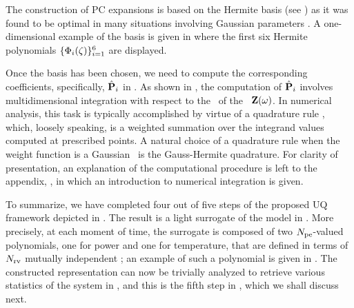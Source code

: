 The construction of PC expansions is based on the Hermite basis (see ) as it was found to be optimal in many situations involving Gaussian parameters \cite{xiu2002}. A one-dimensional example of the basis is given in  where the first six Hermite polynomials $\{ \Phi_i(\zeta) \}_{i = 1}^6$ are displayed.

Once the basis has been chosen, we need to compute the corresponding coefficients, specifically, $\hat{\mathbf{P}}_i$ in . As shown in , the computation of $\hat{\mathbf{P}}_i$ involves multidimensional integration with respect to the \pdf\ of the \rvs\ $\mathbf{Z}(\omega)$. In numerical analysis, this task is typically accomplished by virtue of a quadrature rule \cite{press2007}, which, loosely speaking, is a weighted summation over the integrand values computed at prescribed points. A natural choice of a quadrature rule when the weight function is a Gaussian \pdf\ is the Gauss-Hermite quadrature. For clarity of presentation, an explanation of the computational procedure is left to the appendix, , in which an introduction to numerical integration is given.

To summarize, we have completed four out of five steps of the proposed UQ framework depicted in . The result is a light surrogate of the model in . More precisely, at each moment of time, the surrogate is composed of two ${N_\text{pe}}$-valued polynomials, one for power and one for temperature, that are defined in terms of ${N_\text{rv}}$ mutually independent \rvs; an example of such a polynomial is given in . The constructed representation can now be trivially analyzed to retrieve various statistics of the system in , and this is the fifth step in , which we shall discuss next.
